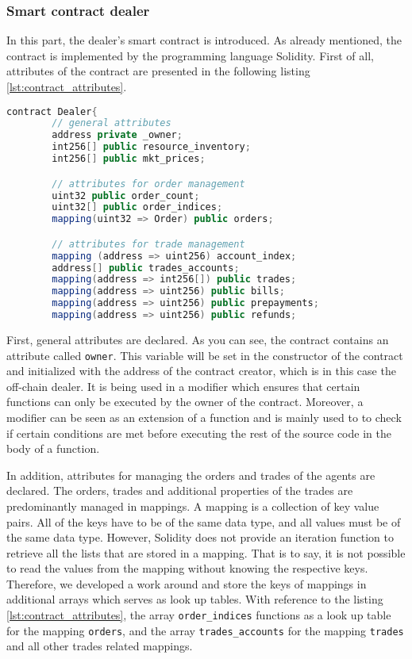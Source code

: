 \subsubsection{Smart contract dealer}

In this part, the dealer's smart contract is introduced. 
As already mentioned, the contract is implemented by the programming language Solidity. 
First of all, attributes of the contract are presented in the following listing \ref{lst:contract_attributes}.

\begin{lstlisting}[float=htbp, label=lst:contract_attributes, caption=Attributes of Smart Contract, language=Java]
    contract Dealer{
        // general attributes
        address private _owner;
        int256[] public resource_inventory;
        int256[] public mkt_prices;

        // attributes for order management
        uint32 public order_count;
        uint32[] public order_indices;
        mapping(uint32 => Order) public orders;

        // attributes for trade management
        mapping (address => uint256) account_index; 
        address[] public trades_accounts;
        mapping(address => int256[]) public trades;
        mapping(address => uint256) public bills;
        mapping(address => uint256) public prepayments;
        mapping(address => uint256) public refunds;
\end{lstlisting}

First, general attributes are declared. As you can see, the contract contains an attribute called \verb|owner|.
This variable will be set in the constructor of the contract and initialized with the address of the contract creator,
which is in this case the off-chain dealer.  
It is being used in a modifier which ensures that certain functions can only be executed by the owner of the contract.
Moreover, a modifier can be seen as an extension of a function and is mainly used to 
to check if certain conditions are met before executing the rest of the source code in the body of a function.

In addition, attributes for managing the orders and trades of the agents are declared. 
The orders, trades and additional properties of the trades are predominantly managed in mappings.
A mapping is a collection of key value pairs. All of the keys have to be of the same data type, and 
all values must be of the same data type. However, Solidity does not provide an iteration
function to retrieve all the lists that are stored in a mapping. 
That is to say, it is not possible to read the values from the mapping without knowing the respective keys.
Therefore, we developed a work around and store the keys of mappings in additional arrays which serves 
as look up tables.
With reference to the listing \ref{lst:contract_attributes}, the array \verb|order_indices| functions as a 
look up table for the mapping \verb|orders|, and the array \verb|trades_accounts| for the mapping 
\verb|trades| and all other trades related mappings.

